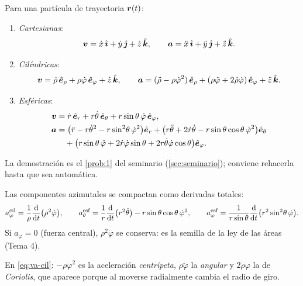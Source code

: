 \begin{proposicion}
\label{prop:va}
Para una partícula de trayectoria $\bm{r}(t)$:
\begin{enumerate}[label=\textcolor{cian}{(\roman*)},leftmargin=2em]
  \item \emph{Cartesianas}:
  \begin{equation}
    \bm{v}=\dot x\,\hat{\bm{\imath}}+\dot y\,\hat{\bm{\jmath}}+\dot z\,\hat{\bm{k}},\qquad
    \bm{a}=\ddot x\,\hat{\bm{\imath}}+\ddot y\,\hat{\bm{\jmath}}+\ddot z\,\hat{\bm{k}} .
  \end{equation}
  \item \emph{Cilíndricas}:
  \begin{equation}
    \bm{v}=\dot\rho\,\hat{\bm{e}}_{\rho}+\rho\dot\varphi\,\hat{\bm{e}}_{\varphi}+\dot z\,\hat{\bm{k}},\qquad
    \bm{a}=(\ddot\rho-\rho\dot\varphi^{2})\,\hat{\bm{e}}_{\rho}
    +(\rho\ddot\varphi+2\dot\rho\dot\varphi)\,\hat{\bm{e}}_{\varphi}+\ddot z\,\hat{\bm{k}} .
    \label{eq:va-cil}
  \end{equation}
  \item \emph{Esféricas}:
  \begin{equation}
    \begin{aligned}
    \bm{v}&=\dot r\,\hat{\bm{e}}_{r}+r\dot\theta\,\hat{\bm{e}}_{\theta}+r\sin\theta\,\dot\varphi\,\hat{\bm{e}}_{\varphi},\\
    \bm{a}&=\bigl(\ddot r-r\dot\theta^{2}-r\sin^{2}\!\theta\,\dot\varphi^{2}\bigr)\hat{\bm{e}}_{r}
     +\bigl(r\ddot\theta+2\dot r\dot\theta-r\sin\theta\cos\theta\,\dot\varphi^{2}\bigr)\hat{\bm{e}}_{\theta}\\
     &\quad+\bigl(r\sin\theta\,\ddot\varphi+2\dot r\dot\varphi\sin\theta+2r\dot\theta\dot\varphi\cos\theta\bigr)\hat{\bm{e}}_{\varphi} .
    \end{aligned}
    \label{eq:va-esf}
  \end{equation}
\end{enumerate}
\end{proposicion}

La demostración es el \cref{prob:1} del seminario
(\cref{sec:seminario}); conviene rehacerla hasta que sea automática.

\begin{observacion}
Las componentes azimutales se compactan como derivadas totales:
\begin{equation}
  a_{\varphi}^{\text{cil}}=\frac{1}{\rho}\frac{\mathop{}\!\mathrm{d} }{\mathop{}\!\mathrm{d} t}\bigl(\rho^{2}\dot\varphi\bigr),
  \qquad
  a_{\theta}^{\text{esf}}=\frac{1}{r}\frac{\mathop{}\!\mathrm{d} }{\mathop{}\!\mathrm{d} t}\bigl(r^{2}\dot\theta\bigr)-r\sin\theta\cos\theta\,\dot\varphi^{2},
  \qquad
  a_{\varphi}^{\text{esf}}=\frac{1}{r\sin\theta}\frac{\mathop{}\!\mathrm{d} }{\mathop{}\!\mathrm{d} t}\bigl(r^{2}\sin^{2}\!\theta\,\dot\varphi\bigr).
\end{equation}
Si $a_{\varphi}=0$ (fuerza central), $\rho^{2}\dot\varphi$ se conserva: es la
semilla de la ley de las áreas (Tema 4).
\end{observacion}

\begin{observacion}
En \eqref{eq:va-cil}: $-\rho\dot\varphi^{2}$ es la aceleración
\emph{centrípeta}, $\rho\ddot\varphi$ la \emph{angular} y
$2\dot\rho\dot\varphi$ la de \emph{Coriolis}, que aparece porque al moverse
radialmente cambia el radio de giro.
\end{observacion}

